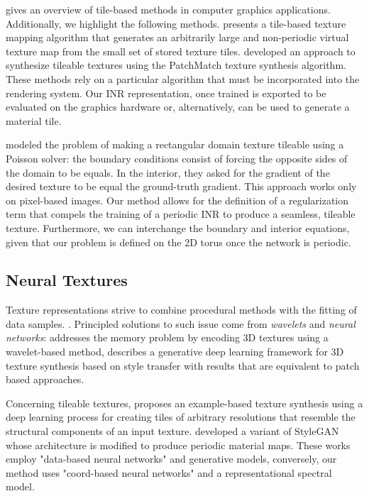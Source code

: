 \citet{tileinteractive} gives an overview of tile-based methods in computer graphics applications.
%
Additionally, we highlight the following methods. \citet{tilehard} presents a tile-based texture mapping algorithm that generates an arbitrarily large and non-periodic virtual texture map from the small set of stored texture tiles. \citet{Moritz2017Texture} developed an approach to synthesize tileable textures using the PatchMatch texture synthesis algorithm.
%
These methods rely on a particular algorithm that must be incorporated into the rendering system. Our INR representation, once trained is exported to be evaluated on the graphics hardware or, alternatively, can be used to generate a material tile.

\citet{perez2023poisson} modeled the problem of making a rectangular domain texture tileable using a Poisson solver: the boundary conditions consist of forcing the opposite sides of the domain to be equals. In the interior, they asked for the gradient of the desired texture to be equal the ground-truth gradient.
This approach works only on pixel-based images.
Our method allows for the definition of a regularization term that compels the training of a periodic INR to produce a seamless, tileable texture. Furthermore, we can interchange the boundary and interior equations, given that our problem is defined on the 2D torus once the network is periodic.


\subsection{Neural Textures}
Texture representations strive to combine procedural methods with the fitting of data samples. .
Principled solutions to such issue come from \emph{wavelets} and \emph{neural networks}: \citet{BAJAJ-2000} addresses the memory problem by encoding 3D textures using a wavelet-based method, \citet{Gutierrez-2019} describes a generative deep learning framework for 3D texture synthesis based on style transfer with results that are equivalent to patch based approaches.

Concerning tileable textures, \citet{deeptile} proposes an example-based texture synthesis using a deep learning process for creating tiles of arbitrary resolutions that resemble the structural components of an input texture.
\citet{zhou2022tilegen} developed a variant of StyleGAN whose architecture is modified to produce periodic material maps.
These works employ "data-based neural networks" and generative models, conversely, our method uses "coord-based neural networks" and a representational spectral model.

